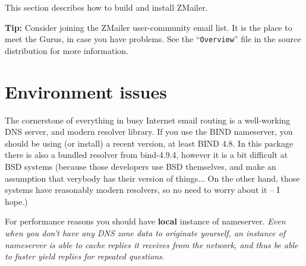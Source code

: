 
This section describes how to build and install ZMailer.

{\bf Tip:} Consider joining the ZMailer user-community email list.
It is the place to meet the Gurus, in case you have problems.
See the ``{\tt Overview}'' file in the source distribution for more
information.

\section{Environment issues}%

The cornerstone of everything in busy Internet email routing
is a well-working DNS server, and modern resolver library.
If you use the BIND nameserver, you should be using (or install)
a recent version, at least BIND 4.8. In this package there is also 
a bundled resolver from  bind-4.9.4, however it is a bit difficult
at BSD systems (because those developers use BSD themselves, and
make an assumption that verybody has their version of things...
On the other hand, those systems have reasonably modern resolvers,
so no need to worry about it -- I hope.) 

For performance reasons you should have {\bf local} instance of
nameserver. {\em Even when you don't have any DNS zone data to
originate yourself, an instance of nameserver is able to cache
replies it receives from the network, and thus be able to faster
yield replies for repeated questions.}


